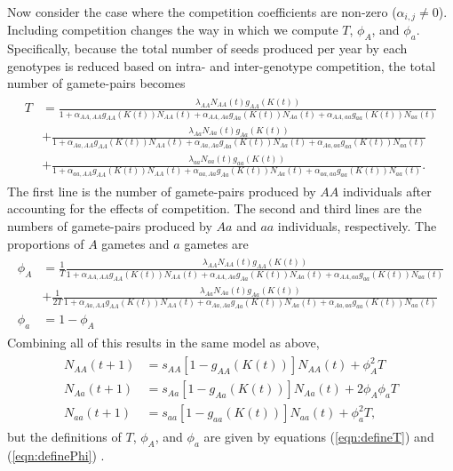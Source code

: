 \documentclass[11pt]{article}
\begin{document}
Now consider the case where the competition coefficients are non-zero ($\alpha_{i,j}\neq0$).  Including competition changes the way in which we compute $T$, $\phi_A$, and $\phi_a$.  Specifically, because the total number of seeds produced per year by each genotypes is reduced based on intra- and inter-genotype competition, the total number of gamete-pairs becomes
\begin{align}\begin{split}
T &=  \frac{\lambda_{AA}N_{AA}(t)g_{AA}(K(t))}{1+ \alpha_{AA,AA}g_{AA}(K(t))N_{AA}(t) + \alpha_{AA,Aa}g_{Aa}(K(t))N_{Aa}(t)+ \alpha_{AA,aa}g_{aa}(K(t))N_{aa}(t)} \\ 
&+ \frac{\lambda_{Aa}N_{Aa}(t)g_{Aa}(K(t))}{1+ \alpha_{Aa,AA}g_{AA}(K(t))N_{AA}(t) + \alpha_{Aa,Aa}g_{Aa}(K(t))N_{Aa}(t)+ \alpha_{Aa,aa}g_{aa}(K(t))N_{aa}(t)}\\
&+\frac{\lambda_{aa}N_{aa}(t)g_{aa}(K(t))}{1+ \alpha_{aa,AA}g_{AA}(K(t))N_{AA}(t) + \alpha_{aa,Aa}g_{Aa}(K(t))N_{Aa}(t)+ \alpha_{aa,aa}g_{aa}(K(t))N_{aa}(t)}.
\label{eqn:defineT}
\end{split}\end{align}
The first line is the number of gamete-pairs produced by $AA$ individuals after accounting for the effects of competition.  The second and third lines are the numbers of gamete-pairs produced by $Aa$ and $aa$ individuals, respectively. The proportions of $A$ gametes and $a$ gametes are 
\begin{align}\begin{split}
\phi_A &= \frac{1}{T}\frac{\lambda_{AA}N_{AA}(t)g_{AA}(K(t))}{1+ \alpha_{AA,AA}g_{AA}(K(t))N_{AA}(t) + \alpha_{AA,Aa}g_{Aa}(K(t))N_{Aa}(t)+ \alpha_{AA,aa}g_{aa}(K(t))N_{aa}(t)} \\
&+ \frac{1}{2T}\frac{\lambda_{Aa}N_{Aa}(t)g_{Aa}(K(t))}{1+ \alpha_{Aa,AA}g_{AA}(K(t))N_{AA}(t) + \alpha_{Aa,Aa}g_{Aa}(K(t))N_{Aa}(t)+ \alpha_{Aa,aa}g_{aa}(K(t))N_{aa}(t)}\\
\phi_a &= 1- \phi_A
\label{eqn:definePhi}
\end{split}\end{align}
Combining all of this results in the same model as above,
\begin{align}\begin{split}
N_{AA}(t+1) &= s_{AA}[1-g_{AA}(K(t))]N_{AA}(t) + \phi_A^2T\\
N_{Aa}(t+1) &= s_{Aa}[1-g_{Aa}(K(t))]N_{Aa}(t) + 2 \phi_A\phi_aT\\
N_{aa}(t+1) &= s_{aa}[1-g_{aa}(K(t))]N_{aa}(t) + \phi_a^2T,
\end{split}\end{align}
but the definitions of $T$, $\phi_A$, and $\phi_a$ are given by equations (\ref{eqn:defineT}) and (\ref{eqn:definePhi}) . 
\end{document}
